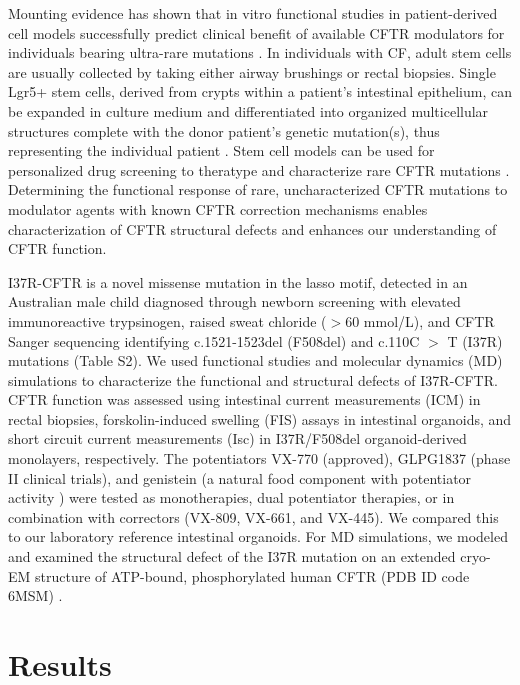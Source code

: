 Mounting evidence has shown that in vitro functional studies in patient-derived cell models successfully predict clinical benefit of available CFTR modulators for individuals bearing ultra-rare mutations \cite{berkers2019, mccarthy2018, ramalho2021}. In individuals with CF, adult stem cells are usually collected by taking either airway brushings or rectal biopsies. Single Lgr5+ stem cells, derived from crypts within a patient's intestinal epithelium, can be expanded in culture medium and differentiated into organized multicellular structures complete with the donor patient's genetic mutation(s), thus representing the individual patient \cite{sato2009}. Stem cell models can be used for personalized drug screening to theratype and characterize rare CFTR mutations \cite{awatade2018, berkers2019, pollard2018}. Determining the functional response of rare, uncharacterized CFTR mutations to modulator agents with known CFTR correction mechanisms enables characterization of CFTR structural defects and enhances our understanding of CFTR function.

I37R-CFTR is a novel missense mutation in the lasso motif, detected in an Australian male child diagnosed through newborn screening with elevated immunoreactive trypsinogen, raised sweat chloride ($>$60 mmol/L), and CFTR Sanger sequencing identifying c.1521-1523del (F508del) and c.110C $>$ T (I37R) mutations (Table S2). We used functional studies and molecular dynamics (MD) simulations to characterize the functional and structural defects of I37R-CFTR. CFTR function was assessed using intestinal current measurements (ICM) in rectal biopsies, forskolin-induced swelling (FIS) assays in intestinal organoids, and short circuit current measurements (Isc) in I37R/F508del organoid-derived monolayers, respectively. The potentiators VX-770 (approved), GLPG1837 (phase II clinical trials), and genistein (a natural food component with potentiator activity \cite{dey2016}) were tested as monotherapies, dual potentiator therapies, or in combination with correctors (VX-809, VX-661, and VX-445). We compared this to our laboratory reference intestinal organoids. For MD simulations, we modeled and examined the structural defect of the I37R mutation on an extended cryo-EM structure of ATP-bound, phosphorylated human CFTR (PDB ID code 6MSM) \cite{zhang2018a}.

\section{Results}
